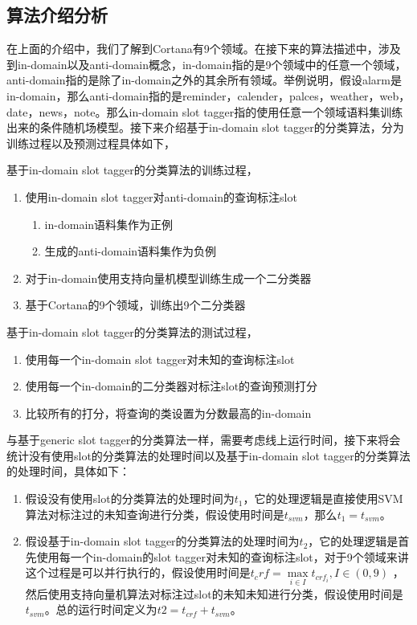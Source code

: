 \documentclass[master]{njuthesis}
\begin{document}
\subsection{算法介绍分析}
    
    在上面的介绍中，我们了解到Cortana有9个领域。在接下来的算法描述中，涉及到in-domain以及anti-domain概念，in-domain指的是9个领域中的任意一个领域，anti-domain指的是除了in-domain之外的其余所有领域。举例说明，假设alarm是in-domain，那么anti-domain指的是reminder，calender，palces，weather，web，date，news，note。那么in-domain slot tagger指的使用任意一个领域语料集训练出来的条件随机场模型。接下来介绍基于in-domain slot tagger的分类算法，分为训练过程以及预测过程具体如下，

   基于in-domain slot tagger的分类算法的训练过程，
   \begin{enumerate}
     \item 使用in-domain slot tagger对anti-domain的查询标注slot
       \begin{enumerate}
         \item in-domain语料集作为正例
         \item 生成的anti-domain语料集作为负例
       \end{enumerate}
     \item 对于in-domain使用支持向量机模型训练生成一个二分类器
     \item 基于Cortana的9个领域，训练出9个二分类器
   \end{enumerate}
  
   基于in-domain slot tagger的分类算法的测试过程，
   \begin{enumerate}
     \item 使用每一个in-domain slot tagger对未知的查询标注slot
     \item 使用每一个in-domain的二分类器对标注slot的查询预测打分
     \item 比较所有的打分，将查询的类设置为分数最高的in-domain
   \end{enumerate}
    
    与基于generic slot tagger的分类算法一样，需要考虑线上运行时间，接下来将会统计没有使用slot的分类算法的处理时间以及基于in-domain slot tagger的分类算法的处理时间，具体如下：
\begin{enumerate}
 \item 假设没有使用slot的分类算法的处理时间为$t_1$，它的处理逻辑是直接使用SVM算法对标注过的未知查询进行分类，假设使用时间是$t_{svm}$，那么$t_1 = t_{svm}$。
 \item 假设基于in-domain slot tagger的分类算法的处理时间为$t_2$，它的处理逻辑是首先使用每一个in-domain的slot tagger对未知的查询标注slot，对于9个领域来讲这个过程是可以并行执行的，假设使用时间是$t_crf=\max\limits_{i \in I} t_{{crf}_i},I \in (0,9)$ ，然后使用支持向量机算法对标注过slot的未知未知进行分类，假设使用时间是$t_{svm}$。总的运行时间定义为$t2 = t_{crf} + t_{svm}$。
\end{enumerate}
\end{document}
